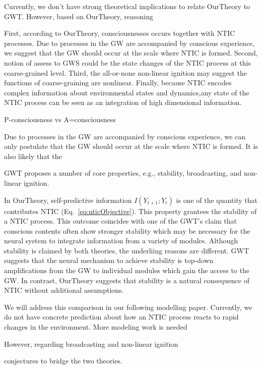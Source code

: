 \documentclass[utf8]{article}
\begin{document}
		
		Currently, we don't have strong theoretical implications to relate \ac{OurTheory} to GWT. However, based on \ac{OurTheory},  reasoning
		
		First, according to \ac{OurTheory}, consciousnesses occurs together with NTIC processes. Due to processes in the GW are accompanied by conscious experience, we suggest that the GW should occur at the scale where NTIC is formed. Second, notion of assess to GWS could be the state changes of the NTIC process at this coarse-grained level. Third, the all-or-none non-linear ignition may suggest the functions of coarse-graining are nonlinear. Finally, because NTIC encodes complex information about environmental states and dynamics,any state of the NTIC process can be seen as an integration of high dimensional information.
		
		
		P-consciousness vs A=consciousness
		
		
		Due to processes in the GW are accompanied by conscious experience, we can only postulate that the GW should occur at the scale where NTIC is formed. It is also likely that the 
		
		GWT proposes a number of core properties, e.g., stability, broadcasting, and non-linear ignition. 
		
		In \ac{OurTheory}, self-predictive information $I(Y_{t+1};Y_{t})$ is one of the quantity that contributes NTIC (Eq.~\ref{eq:nticObjective}). This property grantees the stability of a NTIC process. This outcome coincides with one of the GWT's claim that conscious contents often show stronger stability which may be necessary for the neural system to integrate information from a variety of modules. Although stability is claimed by both theories, the underliing reasons are different. GWT suggests that the neural mechanism to achieve stability is top-down amplifications from the GW to individual modules which gain the access to the GW. In contrast, \ac{OurTheory} suggests that stability is a natural consequence of NTIC without additional assumptions.
		
		We will address this comparison in our following modelling paper.
		Currently, we do not have concrete prediction about how an NTIC process reacts to rapid changes in the environment.
		More modeling work is needed 
		
		
		However, regarding broadcasting and non-linear ignition
		
		
		
		conjectures to bridge the two theories. 
		
\end{document}
